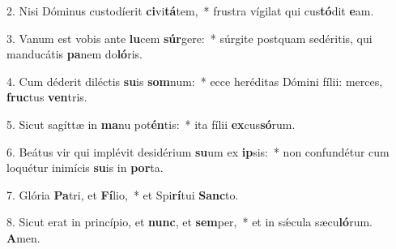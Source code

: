 2. Nisi Dóminus custodíerit \textbf{ci}vi\textbf{tá}tem,~*  frustra vígilat qui cus\textbf{tó}dit \textbf{e}am.\

3. Vanum est vobis ante \textbf{lu}cem \textbf{súr}gere:~*  súrgite postquam sedéritis, qui manducátis \textbf{pa}nem do\textbf{ló}ris.\

4. Cum déderit diléctis \textbf{su}is \textbf{som}num:~*  ecce heréditas Dómini fílii: merces, \textbf{fruc}tus \textbf{ven}tris.\

5. Sicut sagíttæ in \textbf{ma}nu pot\textbf{én}tis:~*  ita fílii \textbf{ex}cus\textbf{só}rum.\

6. Beátus vir qui implévit desidérium \textbf{su}um ex \textbf{ip}sis:~*  non confundétur cum loquétur inimícis \textbf{su}is in \textbf{por}ta.\

7. Glória \textbf{Pa}tri, et \textbf{Fí}lio,~*  et Spi\textbf{rí}tui \textbf{Sanc}to.\

8. Sicut erat in princípio, et \textbf{nunc}, et \textbf{sem}per,~*  et in sǽcula sæcu\textbf{ló}rum. \textbf{A}men.\

